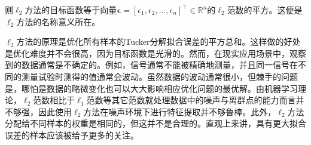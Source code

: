 则$\ell_{2}$方法的目标函数等于向量$\bm{\epsilon}=[\epsilon_1,\epsilon_2,\ldots,\epsilon_n]^{\top}\in\mathbb{R}^{n}$的$\ell_{2}$范数的平方。这便是$\ell_{2}$方法的名称意义所在。

$\ell_{2}$方法的原理是优化所有样本的Tucker分解拟合误差的平方总和。这样做的好处是优化难度并不会很高，因为目标函数是光滑的。然而，在现实应用场景中，观察到的数据通常是不确定的。例如，信号通常不能被精确地测量，并且同一信号在不同的测量试验时测得的值通常会波动。虽然数据的波动通常很小，但棘手的问题是，哪怕是数据的略微变化也可以大大影响相应优化问题的最优解。由机器学习理论，$\ell_{2}$范数相比于$\ell_{1}$范数等其它范数就处理数据中的噪声与离群点的能力而言并不够强，因此使用$\ell_{2}$方法在噪声环境下进行特征提取并不够鲁棒。此外，$\ell_{2}$方法分配给不同样本的权重是相同的，但这并不是合理的。直观上来讲，具有更大拟合误差的样本应该被给予更多的关注。

